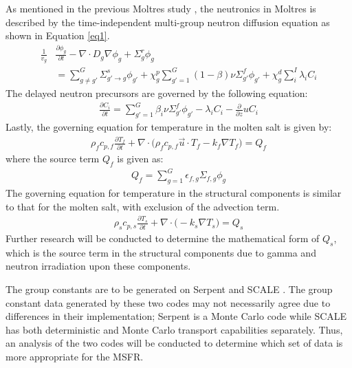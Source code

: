 \documentclass{anstrans}
\begin{document}
As mentioned in the previous Moltres study \cite{lindsay_introduction_2018}, the neutronics in Moltres is described by the time-independent multi-group neutron diffusion equation as shown in Equation \ref{eq1}.
\begin{align}
\frac{1}{v_g} &\frac{\partial \phi_g}{\partial t} - \nabla \cdot D_g \nabla \phi_g + \Sigma^r_g \phi_g \nonumber \\ 
&= \sum^G_{g \neq g'} \Sigma^s_{g' \rightarrow g} \phi_{g'} + \chi^p_g \sum^G_{g'=1} (1-\beta) \nu \Sigma^f_{g'} \phi_{g'} + \chi^d_g \sum^I_i \lambda_i C_i \label{eq1}
\end{align}
The delayed neutron precursors are governed by the following equation:
\begin{align}
\frac{\partial C_i}{\partial t} = \sum^G_{g'=1} \beta_i \nu \Sigma^f_{g'} \phi_{g'} - \lambda_i C_i - \frac{\partial}{\partial z} u C_i \label{eq2}
\end{align}
Lastly, the governing equation for temperature in the molten salt is given by:
\begin{align}
\rho_f c_{p,f} \frac{\partial T_f}{\partial t} + \nabla \cdot \big( \rho_f c_{p,f} \overrightarrow{u} \cdot T_f - k_f \nabla T_f \big) = Q_f \label{eq3}
\end{align}
where the source term $Q_f$ is given as:
\begin{align}
Q_f = \sum^G_{g=1} \epsilon_{f,g} \Sigma_{f,g} \phi_g \label{eq4}
\end{align}
The governing equation for temperature in the structural components is similar to that for the molten salt, with exclusion of the advection term.
\begin{align}
\rho_s c_{p,s} \frac{\partial T_s}{\partial t} + \nabla \cdot \big(- k_s \nabla T_s \big) = Q_s \label{eq5}
\end{align}
Further research will be conducted to determine the mathematical form of $Q_s$, which is the source term in the structural components due to gamma and neutron irradiation upon these components.

The group constants are to be generated on Serpent \cite{leppanen_serpent_2015} and SCALE \cite{dehart_reactor_2011}. The group constant data generated by these two codes may not necessarily agree due to differences in their implementation; Serpent is a Monte Carlo code while SCALE has both deterministic and Monte Carlo transport capabilities separately. Thus, an analysis of the two codes will be conducted to determine which set of data is more appropriate for the MSFR.
\end{document}

